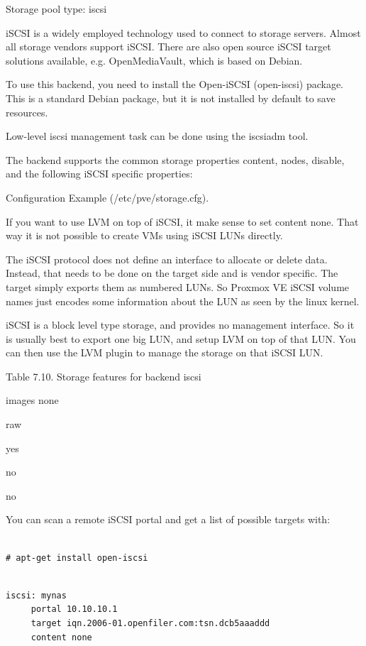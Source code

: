Storage pool type: iscsi

iSCSI is a widely employed technology used to connect to storage servers. Almost all storage vendors support iSCSI. There are also open source iSCSI target solutions available, e.g. OpenMediaVault, which is based on Debian.

To use this backend, you need to install the Open-iSCSI (open-iscsi) package. This is a standard Debian package, but it is not installed by default to save resources.

Low-level iscsi management task can be done using the iscsiadm tool.

The backend supports the common storage properties content, nodes, disable, and the following iSCSI specific properties:

Configuration Example (/etc/pve/storage.cfg).

If you want to use LVM on top of iSCSI, it make sense to set content none. That way it is not possible to create VMs using iSCSI LUNs directly.

The iSCSI protocol does not define an interface to allocate or delete data. Instead, that needs to be done on the target side and is vendor specific. The target simply exports them as numbered LUNs. So Proxmox VE iSCSI volume names just encodes some information about the LUN as seen by the linux kernel.

iSCSI is a block level type storage, and provides no management interface. So it is usually best to export one big LUN, and setup LVM on top of that LUN. You can then use the LVM plugin to manage the storage on that iSCSI LUN.

Table 7.10. Storage features for backend iscsi

images none

raw

yes

no

no

You can scan a remote iSCSI portal and get a list of possible targets with:

\begin{lstlisting}

# apt-get install open-iscsi

\end{lstlisting}

\begin{lstlisting}

iscsi: mynas
     portal 10.10.10.1
     target iqn.2006-01.openfiler.com:tsn.dcb5aaaddd
     content none

\end{lstlisting}

